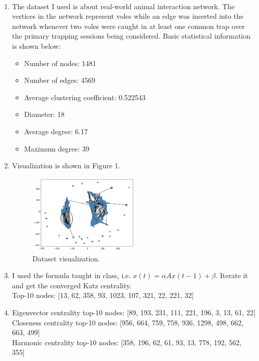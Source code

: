 \documentclass[12pt]{article}
\newcommand {\bsolution}{\noindent {\em Solution:} \ }
\begin{document}
\bsolution
\begin{enumerate}[label=(\alph*)]
	\item The dataset I used is about real-world animal interaction network\cite{nr-aaai15}. The vertices in the network represent voles while an edge was inserted into the network whenever two voles were caught in at least one common trap over the primary trapping sessions being considered. Basic statistical information is shown below:
	\begin{itemize}
		\item Number of nodes: 1481
		\item Number of edges: 4569
		\item Average clustering coefficient: 0.522543
		\item Diameter: 18
		\item Average degree: 6.17
		\item Maximum degree: 39
	\end{itemize}
	\item Visualization is shown in Figure 1.
	\begin{figure}[h]
		\centering
		\includegraphics[width=0.5\textwidth]{fig-prob2b.png}
		\caption{Dataset visualization.}
		\label{HW2_2}
	\end{figure}
	\item I used the formula taught in class, i.e. $x(t)=\alpha Ax(t-1)+\beta$. Iterate it and get the converged Katz centrality.\\[1em]
	Top-10 nodes: [13, 62, 358, 93, 1023, 107, 321, 22, 221, 32]
	\item Eigenvector centrality top-10 nodes: [89, 193, 231, 111, 221, 196, 3, 13, 61, 22]\\[1em]
		  Closeness centrality top-10 nodes: [956, 664, 759, 758, 936, 1298, 498, 662, 663, 499]\\[1em]
		  Harmonic centrality top-10 nodes: [358, 196, 62, 61, 93, 13, 778, 192, 562, 355]\\[1em]

\end{enumerate}
\end{document}
